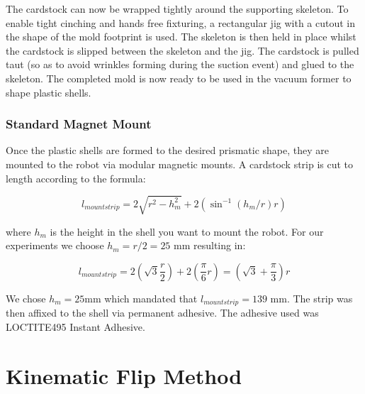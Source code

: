 \documentclass[letterpaper]{report}
\begin{document}
The cardstock can now be wrapped tightly around the supporting skeleton.
To enable tight cinching and hands free fixturing, a rectangular jig with a cutout in the shape of the mold footprint is used.
The skeleton is then held in place whilst the cardstock is slipped between the skeleton and the jig.
The cardstock is pulled taut (so as to avoid wrinkles forming during the suction event) and glued to the skeleton.
The completed mold is now ready to be used in the vacuum former to shape plastic shells.

\subsubsection{Standard Magnet Mount}
Once the plastic shells are formed to the desired prismatic shape, they are mounted to the robot via modular magnetic mounts.
A cardstock strip is cut to length according to the formula:

$$
l_{mountstrip} = 2 \sqrt{r^2 - h_m^2} + 2 (\sin^{-1}(h_m/r) r)
$$

where $h_m$ is the height in the shell you want to mount the robot.
For our experiments we choose $h_m = r/2 = 25$ mm resulting in:

$$
l_{mountstrip} = 2 (\sqrt{3} \frac{r}{2}) + 2 (\frac{\pi}{6} r) = (\sqrt{3} + \frac{\pi}{3} ) r
$$

We chose $h_m = 25$mm which mandated that $l_{mountstrip} = 139$ mm.
The strip was then affixed to the shell via permanent adhesive. The adhesive used was LOCTITE495 Instant Adhesive.

\section{Kinematic Flip Method}
\end{document}

